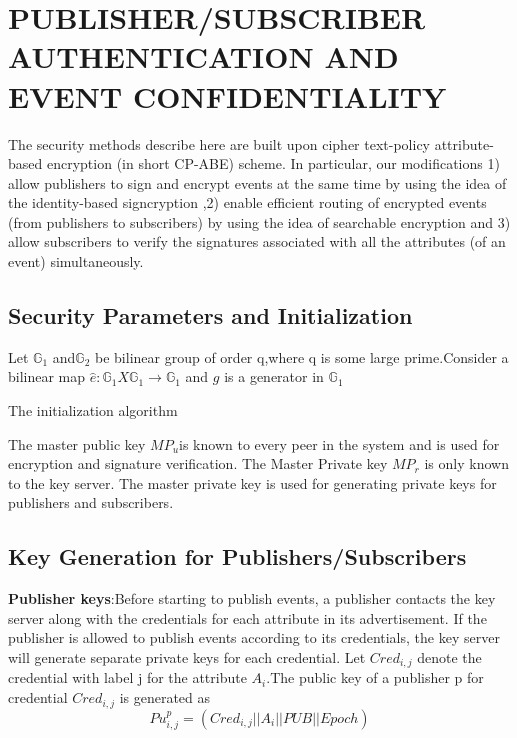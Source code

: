 \documentclass[MTech]{iitmdiss}
\begin{document}
\pagebreak
\clearpage
\chapter{PUBLISHER/SUBSCRIBER AUTHENTICATION AND EVENT CONFIDENTIALITY}
The security methods describe here are built
upon cipher text-policy attribute-based encryption (in short
CP-ABE) scheme. In particular, our modifications 1) allow publishers to sign and
encrypt events at the same time by using the idea of the
identity-based signcryption ,2) enable efficient routing of encrypted events (from
publishers to subscribers) by using the idea of searchable
encryption and 3) allow
subscribers to verify the signatures associated with all the
attributes (of an event) simultaneously.\
\section{Security Parameters and Initialization}
Let  $\mathbb{G}_1 $ and$\mathbb{G}_2 $ be bilinear group of order q,where q is some large prime.Consider a  bilinear map $\hat{e}:\mathbb{G}_1  X \mathbb{G}_1\rightarrow \mathbb{G}_1$ and $\textit{g}$ is a generator in $\mathbb{G}_1$ \
\begin{algorithm}
  \caption{The initialization algorithm}
  \label{alg2}
  \begin{algorithmic}[1]
  
\end{algorithmic}
\end{algorithm}
The master public key ${MP}_u$is known to every peer in the system and is used for encryption and signature
verification. The Master Private key ${MP}_r$ is
only known to the key server. The master private key is
used for generating private keys for publishers and
subscribers.
\section{Key Generation for Publishers/Subscribers}
\textbf{Publisher keys}:Before starting to publish events, a publisher contacts the key server along with the credentials for each
attribute in its advertisement. If the publisher is allowed to
publish events according to its credentials, the key server
will generate separate private keys for each credential. Let
${Cred}_{i,j}$ denote the credential with label j for
 the attribute $A_i$.The public key of a publisher p for credential ${Cred}_{i,j}$
is generated as
\begin{equation}
\label{eq-quad}
Pu_{i,j}^p=(Cred_{i,j}||A_i||PUB||Epoch)
\end{equation}
\end{document}
